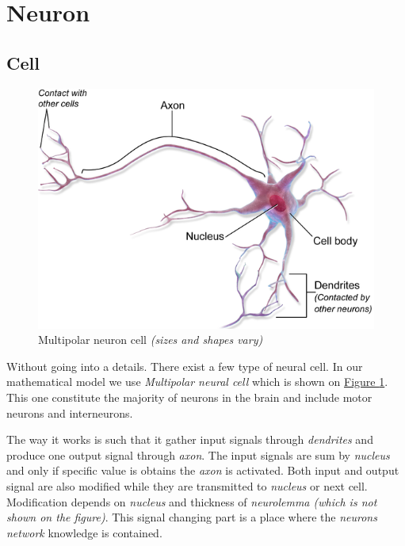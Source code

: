 \section{Neuron}

\subsection{Cell}

\begin{figure}[!h]
    \centering
    \includegraphics[scale=1]{Media/MultipolarNeuron.png}
    \caption[Multipolar neuron cell]{Multipolar neuron cell \textit{(sizes and shapes vary)}}
    \label{fig:MultipolarNeuronCell}
\end{figure}

Without going into a details. There exist a few type of neural cell. In our mathematical model we use \textit{Multipolar neural cell} which is shown on \hyperref[fig:MultipolarNeuronCell]{Figure \ref{fig:MultipolarNeuronCell}}. This one constitute the majority of neurons in the brain and include motor neurons and interneurons.

The way it works is such that it gather input signals through \textit{dendrites} and produce one output signal through \textit{axon}. The input signals are sum by \textit{nucleus} and only if specific value is obtains the \textit{axon} is activated. Both input and output signal are also modified while they are transmitted to \textit{nucleus} or next cell. Modification depends on \textit{nucleus} and thickness of \textit{neurolemma (which is not shown on the figure)}. This signal changing part is a place where the \textit{neurons network} knowledge is contained.

